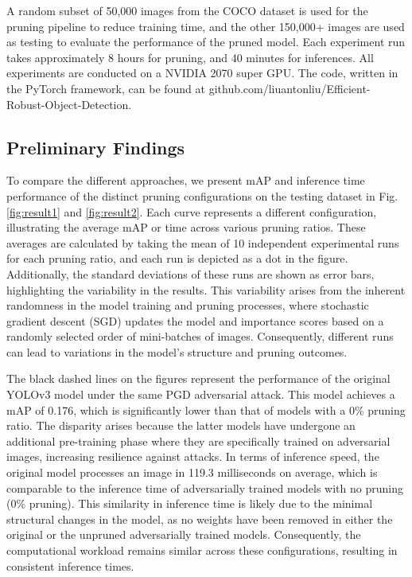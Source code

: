 \documentclass[journal,onecolumn,12pt]{IEEEtran}
\begin{document}
A random subset of 50,000 images from the COCO dataset is used for the pruning pipeline to reduce training time, and the other 150,000+ images are used as testing to evaluate the performance of the pruned model. Each experiment run takes approximately 8 hours for pruning, and 40 minutes for inferences. All experiments are conducted on a NVIDIA 2070 super GPU. The code, written in the PyTorch framework, can be found at github.com/liuantonliu/Efficient-Robust-Object-Detection.

\subsection{Preliminary Findings}
To compare the different approaches, we present mAP and inference time performance of the distinct pruning configurations on the testing dataset in Fig. \ref{fig:result1} and \ref{fig:result2}. Each curve represents a different configuration, illustrating the average mAP or time across various pruning ratios. These averages are calculated by taking the mean of 10 independent experimental runs for each pruning ratio, and each run is depicted as a dot in the figure. Additionally, the standard deviations of these runs are shown as error bars, highlighting the variability in the results. This variability arises from the inherent randomness in the model training and pruning processes, where stochastic gradient descent (SGD) updates the model and importance scores based on a randomly selected order of mini-batches of images. Consequently, different runs can lead to variations in the model's structure and pruning outcomes. 

The black dashed lines on the figures represent the performance of the original YOLOv3 model under the same PGD adversarial attack. This model achieves a mAP of 0.176, which is significantly lower than that of models with a 0\% pruning ratio. The disparity arises because the latter models have undergone an additional pre-training phase where they are specifically trained on adversarial images, increasing resilience against attacks. In terms of inference speed, the original model processes an image in 119.3 milliseconds on average, which is comparable to the inference time of adversarially trained models with no pruning (0\% pruning). This similarity in inference time is likely due to the minimal structural changes in the model, as no weights have been removed in either the original or the unpruned adversarially trained models. Consequently, the computational workload remains similar across these configurations, resulting in consistent inference times.
\end{document}
